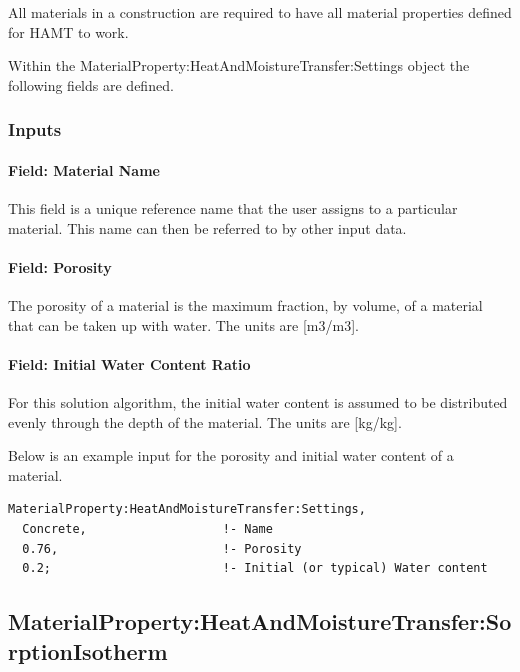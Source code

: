 All materials in a construction are required to have all material properties defined for HAMT to work.

Within the MaterialProperty:HeatAndMoistureTransfer:Settings object the following fields are defined.

\subsubsection{Inputs}\label{inputs-7-026}

\paragraph{Field: Material Name}\label{field-material-name-000}

This field is a unique reference name that the user assigns to a particular material. This name can then be referred to by other input data.

\paragraph{Field: Porosity}\label{field-porosity}

The porosity of a material is the maximum fraction, by volume, of a material that can be taken up with water. The units are {[}m3/m3{]}.

\paragraph{Field: Initial Water Content Ratio}\label{field-initial-water-content-ratio}

For this solution algorithm, the initial water content is assumed to be distributed evenly through the depth of the material. The units are {[}kg/kg{]}.

Below is an example input for the porosity and initial water content of a material.

\begin{lstlisting}
MaterialProperty:HeatAndMoistureTransfer:Settings,
  Concrete,                   !- Name
  0.76,                       !- Porosity
  0.2;                        !- Initial (or typical) Water content
\end{lstlisting}

\subsection{MaterialProperty:HeatAndMoistureTransfer:SorptionIsotherm}\label{materialpropertyheatandmoisturetransfersorptionisotherm}

